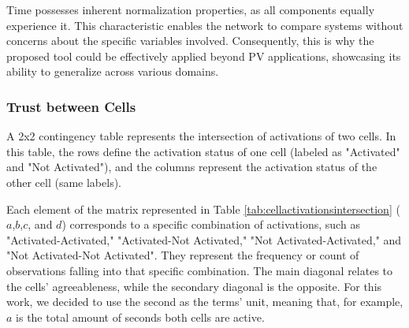 Time possesses inherent normalization properties, as all components equally experience it. This characteristic enables the network to compare systems without concerns about the specific variables involved. Consequently, this is why the proposed tool could be effectively applied beyond PV applications, showcasing its ability to generalize across various domains.

\subsubsection{Trust between Cells}

A 2x2 contingency table represents the intersection of activations of two cells. In this table, the rows define the activation status of one cell (labeled as "Activated" and "Not Activated"), and the columns represent the activation status of the other cell (same labels).

\begin{table}[h!]
    \centering
    \caption{Contigency table representing the activation intersection of two cells.}
    \label{tab:cellactivationsintersection}
\end{table}

Each element of the matrix represented in Table \ref{tab:cellactivationsintersection} ($a$,$b$,$c$, and $d$) corresponds to a specific combination of activations, such as "Activated-Activated," "Activated-Not Activated," "Not Activated-Activated," and "Not Activated-Not Activated". They represent the frequency or count of observations falling into that specific combination. The main diagonal relates to the cells' agreeableness, while the secondary diagonal is the opposite. For this work, we decided to use the second as the terms' unit, meaning that, for example, $a$ is the total amount of seconds both cells are active.

